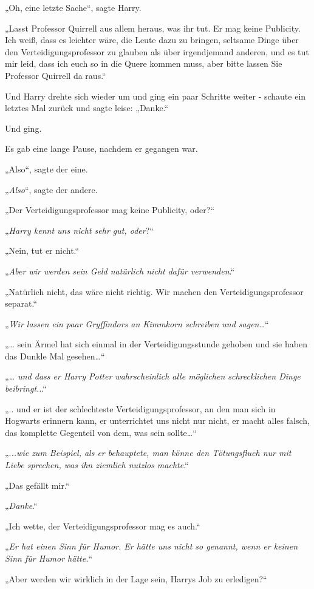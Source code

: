 {„Oh, eine letzte Sache“, sagte Harry.

„Lasst Professor Quirrell aus allem heraus, was ihr tut. Er mag keine Publicity. Ich weiß, dass es leichter wäre, die Leute dazu zu bringen, seltsame Dinge über den Verteidigungsprofessor zu glauben als über irgendjemand anderen, und es tut mir leid, dass ich euch so in die Quere kommen muss, aber bitte lassen Sie Professor Quirrell da raus.“

Und Harry drehte sich wieder um und ging ein paar Schritte weiter - schaute ein letztes Mal zurück und sagte leise: „Danke.“

Und ging.

Es gab eine lange Pause, nachdem er gegangen war.

„Also“, sagte der eine.

„\emph{Also}“, sagte der andere.

„Der Verteidigungsprofessor mag keine Publicity, oder?“

„\emph{Harry kennt uns nicht sehr gut, oder}?“

„Nein, tut er nicht.“

„\emph{Aber wir werden sein Geld natürlich nicht dafür verwenden}.“

„Natürlich nicht, das wäre nicht richtig. Wir machen den Verteidigungsprofessor separat.“

„\emph{Wir lassen ein paar Gryffindors an Kimmkorn schreiben und sagen…}“

„… sein Ärmel hat sich einmal in der Verteidigungsstunde gehoben und sie haben das Dunkle Mal gesehen…“

„\emph{… und dass er Harry Potter wahrscheinlich alle möglichen schrecklichen Dinge} \emph{beibringt.}..“

„.. und er ist der schlechteste Verteidigungsprofessor, an den man sich in Hogwarts erinnern kann, er unterrichtet uns nicht nur nicht, er macht alles falsch, das komplette Gegenteil von dem, was sein sollte…“

„.\emph{..wie zum Beispiel, als er behauptete, man könne den Tötungsfluch nur mit Liebe sprechen, was ihn ziemlich nutzlos machte}.“

„Das gefällt mir.“

„\emph{Danke}.“

„Ich wette, der Verteidigungsprofessor mag es auch.“

„\emph{Er hat einen Sinn für Humor. Er hätte uns nicht so genannt, wenn er keinen Sinn für Humor hätte.}“

„Aber werden wir wirklich in der Lage sein, Harrys Job zu erledigen?“

}
